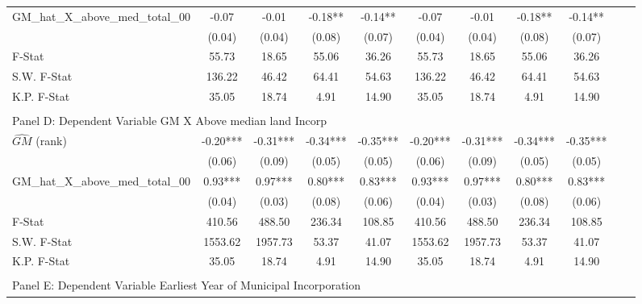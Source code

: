 \begin{table}[htbp]
\begin{threeparttable}
\begin{tabular}{l*{10}{c}}
\addlinespace
GM\_hat\_X\_above\_med\_total\_00&      -0.07   &      -0.01   &      -0.18** &      -0.14** &      -0.07   &      -0.01   &      -0.18** &      -0.14** \\
                &     (0.04)   &     (0.04)   &     (0.08)   &     (0.07)   &     (0.04)   &     (0.04)   &     (0.08)   &     (0.07)   \\
\midrule
F-Stat          &      55.73   &      18.65   &      55.06   &      36.26   &      55.73   &      18.65   &      55.06   &      36.26   \\
S.W. F-Stat     &     136.22   &      46.42   &      64.41   &      54.63   &     136.22   &      46.42   &      64.41   &      54.63   \\
K.P. F-Stat     &      35.05   &      18.74   &       4.91   &      14.90   &      35.05   &      18.74   &       4.91   &      14.90   \\
\cmidrule[\heavyrulewidth](lr){1-9} \\ \cmidrule[\heavyrulewidth](lr){1-9}
\multicolumn{8}{l}{Panel D: Dependent Variable GM X Above median land Incorp}\\
\cmidrule(lr){1-9}
$\hat{GM}$ (rank)&      -0.20***&      -0.31***&      -0.34***&      -0.35***&      -0.20***&      -0.31***&      -0.34***&      -0.35***\\
                &     (0.06)   &     (0.09)   &     (0.05)   &     (0.05)   &     (0.06)   &     (0.09)   &     (0.05)   &     (0.05)   \\
\addlinespace
GM\_hat\_X\_above\_med\_total\_00&       0.93***&       0.97***&       0.80***&       0.83***&       0.93***&       0.97***&       0.80***&       0.83***\\
                &     (0.04)   &     (0.03)   &     (0.08)   &     (0.06)   &     (0.04)   &     (0.03)   &     (0.08)   &     (0.06)   \\
\midrule
F-Stat          &     410.56   &     488.50   &     236.34   &     108.85   &     410.56   &     488.50   &     236.34   &     108.85   \\
S.W. F-Stat     &    1553.62   &    1957.73   &      53.37   &      41.07   &    1553.62   &    1957.73   &      53.37   &      41.07   \\
K.P. F-Stat     &      35.05   &      18.74   &       4.91   &      14.90   &      35.05   &      18.74   &       4.91   &      14.90   \\
\cmidrule[\heavyrulewidth](lr){1-9} \\ \cmidrule[\heavyrulewidth](lr){1-9}
\multicolumn{8}{l}{Panel E: Dependent Variable Earliest Year of Municipal Incorporation}\\

\end{tabular}
\end{threeparttable}
\end{table}
